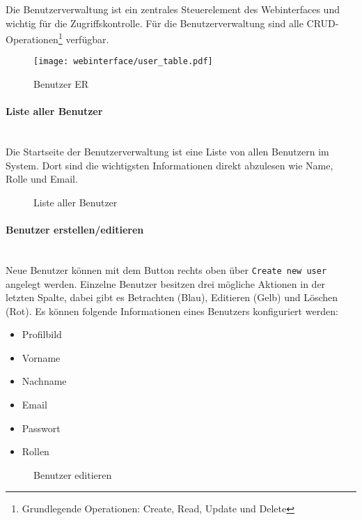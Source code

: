 Die Benutzerverwaltung ist ein zentrales Steuerelement des Webinterfaces und wichtig
für die Zugriffskontrolle. Für die Benutzerverwaltung sind alle CRUD-Operationen\footnote{Grundlegende Operationen:
Create, Read, Update und Delete} verfügbar.

\begin{figure}[H]
  \centering
  \texttt{[image: webinterface/user\_table.pdf]}
  \caption{Benutzer ER}
\end{figure}

\paragraph{Liste aller Benutzer}\mbox{}\\

Die Startseite der Benutzerverwaltung ist eine Liste von allen Benutzern im
System. Dort sind die wichtigsten Informationen direkt abzulesen wie Name, Rolle
und Email.

\begin{figure}[H]
  \centering
  \caption{Liste aller Benutzer}
\end{figure}

\paragraph{Benutzer erstellen/editieren}\mbox{}\\

Neue Benutzer können mit dem Button rechts oben über \verb|Create new user| angelegt
werden. Einzelne Benutzer besitzen drei mögliche Aktionen in der letzten Spalte,
dabei gibt es Betrachten (Blau), Editieren (Gelb) und Löschen (Rot). Es können
folgende Informationen eines Benutzers konfiguriert werden:

\begin{itemize}
  \item Profilbild
  \item Vorname
  \item Nachname
  \item Email
  \item Passwort
  \item Rollen
\end{itemize}

\begin{figure}[H]
  \centering
  \caption{Benutzer editieren}
\end{figure}


